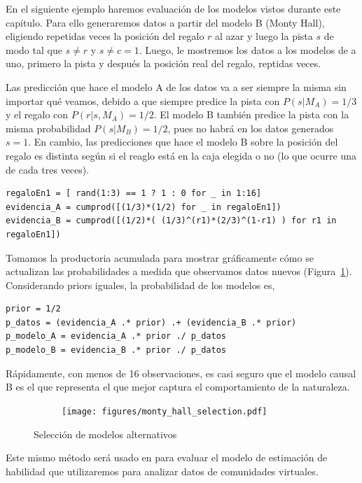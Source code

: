 \documentclass[a4paper,11pt]{book}
\theoremstyle{definition}
\begin{document}

En el siguiente ejemplo haremos evaluación de los modelos vistos durante este capítulo.
%
Para ello generaremos datos a partir del modelo B (Monty Hall), eligiendo repetidas veces la posición del regalo $r$ al azar y luego la pista $s$ de modo tal que $s\neq r$ y $s\neq c = 1$.
%
Luego, le mostremos los datos a los modelos de a uno, primero la pista y después la posición real del regalo, reptidas veces.


Las predicción que hace el modelo A de los datos va a ser siempre la misma sin importar qué veamos, debido a que siempre predice la pista con $P(s|M_A) = 1/3$ y el regalo con $P(r|s,M_A) = 1/2$.
%
El modelo B también predice la pista con la misma probabilidad $P(s|M_B)=1/2$, pues no habrá en los datos generados $s=1$.
%
En cambio, las predicciones que hace el modelo B sobre la posición del regalo es distinta según si el reaglo está en la caja elegida o no (lo que ocurre una de cada tres veces).
%
\begin{lstlisting}[backgroundcolor=\color{all}]
regaloEn1 = [ rand(1:3) == 1 ? 1 : 0 for _ in 1:16]
evidencia_A = cumprod([(1/3)*(1/2) for _ in regaloEn1])
evidencia_B = cumprod([(1/2)*( (1/3)^(r1)*(2/3)^(1-r1) ) for r1 in regaloEn1])
\end{lstlisting}
%
Tomamos la productoria acumulada para mostrar gráficamente cómo se actualizan las probabilidades a medida que observamos datos nuevos (Figura~\ref{fig:monty_hall_selection}).
%
Considerando priors iguales, la probabilidad de los modelos es,
%
\begin{lstlisting}[backgroundcolor=\color{all}]
prior = 1/2
p_datos = (evidencia_A .* prior) .+ (evidencia_B .* prior)
p_modelo_A = evidencia_A .* prior ./ p_datos
p_modelo_B = evidencia_B .* prior ./ p_datos
\end{lstlisting}
%
Rápidamente, con menos de 16 observaciones, es casi seguro que el modelo causal B es el que representa el que mejor captura el comportamiento de la naturaleza.
%
\begin{figure}[H]
    \centering
    \begin{subfigure}[b]{0.45\textwidth}
    \texttt{[image: figures/monty\_hall\_selection.pdf]}
    \end{subfigure}
    \caption{
    Selección de modelos alternativos
    }
    \label{fig:monty_hall_selection}
\end{figure}
%
Este mismo método será usado en para evaluar el modelo de estimación de habilidad que utilizaremos para analizar datos de comunidades virtuales.
\end{document}
